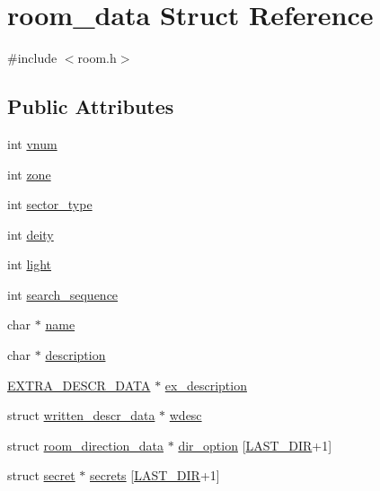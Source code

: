 \hypertarget{structroom__data}{\section{room\-\_\-data Struct Reference}
\label{structroom__data}
}


{\ttfamily \#include $<$room.\-h$>$}

\subsection*{Public Attributes}
\begin{DoxyCompactItemize}
\item 
int \hyperlink{structroom__data_a1da0540f0aa7691a1f0083cfa2c5503e}{vnum}
\item 
int \hyperlink{structroom__data_a383dffb948db697aa64c2dbcfe3872a9}{zone}
\item 
int \hyperlink{structroom__data_adcba259049bfe3580ddba8f5ec8f14aa}{sector\-\_\-type}
\item 
int \hyperlink{structroom__data_a84dd99267244c69b0008fd5288ba36a4}{deity}
\item 
int \hyperlink{structroom__data_a648c8cb52e1ec2627819c9693f1bb841}{light}
\item 
int \hyperlink{structroom__data_aecb36bedf2a3d19b76182ae6f53ed707}{search\-\_\-sequence}
\item 
char $\ast$ \hyperlink{structroom__data_a6e34bceb6379469470f8d136b6b9fd2e}{name}
\item 
char $\ast$ \hyperlink{structroom__data_a6e3a9b1bac21549b5f2e8dad993a39db}{description}
\item 
\hyperlink{structs_8h_a23e61a3ec169d1e601ef3325a7daa744}{E\-X\-T\-R\-A\-\_\-\-D\-E\-S\-C\-R\-\_\-\-D\-A\-T\-A} $\ast$ \hyperlink{structroom__data_a2b1f9a94eb87c1aed90ae71c1230f505}{ex\-\_\-description}
\item 
struct \hyperlink{structwritten__descr__data}{written\-\_\-descr\-\_\-data} $\ast$ \hyperlink{structroom__data_aa9dfc209119e69c508c5b6d77b1b106b}{wdesc}
\item 
struct \hyperlink{structroom__direction__data}{room\-\_\-direction\-\_\-data} $\ast$ \hyperlink{structroom__data_ad7c6124bd14b4bb083c6ae973b21f31a}{dir\-\_\-option} \mbox{[}\hyperlink{structs_8h_a058f44e8c189e50ab72f392b9ecf5cf0}{L\-A\-S\-T\-\_\-\-D\-I\-R}+1\mbox{]}
\item 
struct \hyperlink{structsecret}{secret} $\ast$ \hyperlink{structroom__data_a510a214502c552df4cd150fb29cd7494}{secrets} \mbox{[}\hyperlink{structs_8h_a058f44e8c189e50ab72f392b9ecf5cf0}{L\-A\-S\-T\-\_\-\-D\-I\-R}+1\mbox{]}

\end{DoxyCompactItemize}
